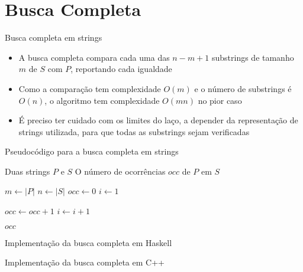 \section{Busca Completa}


\begin{frame}[fragile]{Busca completa em strings}

    \begin{itemize}
        \item A busca completa compara cada uma das $n - m + 1$ substrings de tamanho $m$ de $S$ 
            com $P$, reportando cada igualdade

        \item Como a comparação tem complexidade $O(m)$ e o número de substrings é $O(n)$, o 
            algoritmo tem complexidade $O(mn)$ no pior caso

        \item É preciso ter cuidado com os limites do laço, a depender da representação de 
            strings utilizada, para que todas as substrings sejam verificadas
    \end{itemize}

\end{frame}

\begin{frame}[fragile]{Pseudocódigo para a busca completa em strings}

    \begin{algorithm}[H]
        \caption{Busca completa em Strings}
        \begin{algorithmic}[1]
            \Require Duas strings $P$ e $S$
            \Ensure O número de ocorrências $occ$ de $P$ em $S$

                \State $m \gets |P|$
                \State $n \gets |S|$
                \State $occ \gets 0$
                \State $i \gets 1$

                        \State $occ \gets occ + 1$
                    \EndIf
                    \State $i \gets i + 1$
                \EndWhile

                \State \Return $occ$
            \EndFunction
        \end{algorithmic}
    \end{algorithm}

\end{frame}

\begin{frame}[fragile]{Implementação da busca completa em Haskell}
\end{frame}

\begin{frame}[fragile]{Implementação da busca completa em C++}
\end{frame}

